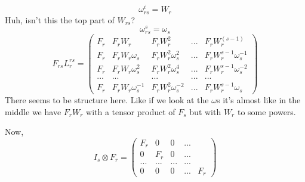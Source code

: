 \documentclass{article}
\begin{document}
	\begin{equation}
		\omega_{rs}^i=W_{r}
	\end{equation}
	Huh, isn't this the top part of $W_{rs}$?
	\begin{equation}
		\omega_{rs}^s=\omega_{s}
	\end{equation}
	\begin{equation}
		F_{rs}L^{rs}_r=\begin{pmatrix}
			F_r & F_rW_r & F_rW_r^2 & ... & F_rW_r^(s-1) \\
			F_r & F_rW_r\omega_s & F_rW_r^2\omega_s^2 & ... & F_rW_r^{s-1}\omega_s^{-1} \\
			F_r & F_rW_r\omega_s^2 & F_rW_r^2\omega_s^4 & ... &
			F_rW_r^{s-1}\omega_s^{-2} \\
			...& ...&...&...&...\\
			F_r & F_rW_r\omega_s^{-1} &F_rW_r^2\omega_s^{-2} & ... & F_rW_r^{s-1}\omega_s
			
		\end{pmatrix}
	\end{equation}
There seems to be structure here. Like if we look at the $\omega$s it's almost like in the middle we have $F_rW_r$ with a tensor product of $F_s$ but with $W_r$ to some powers.

	Now,
	\begin{equation}
		 I_s \otimes F_r = \begin{pmatrix}
			F_r & 0 & 0 &... \\
			0 & F_r & 0 & ... \\
			... & ... & ... & ... \\
			0& 0 & 0 & ... & F_r
		\end{pmatrix}
	\end{equation}
\end{document}

